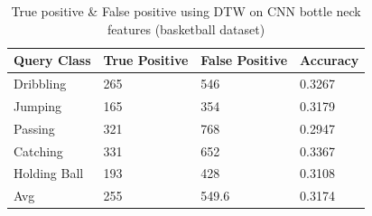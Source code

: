 \begin{table}[ht]
\caption[Event classification using DTW on CNN bottleneck features (OSUPEL basketball dataset) ]{True positive \& False positive using DTW on CNN bottle neck features (basketball dataset)}
\label{table:cnn_dtw_res_basket}
\centering
\begin{tabular}{|l|l|l|l|}
\hline
Query Class & True Positive & False Positive & Accuracy \\ \hline
Dribbling   &265  &546   &0.3267\\
Jumping     &165  &354   &0.3179\\
Passing     &321  &768   &0.2947\\
Catching    &331  &652   &0.3367\\
Holding Ball &193  &428   &0.3108\\
\hline
Avg         &255  &549.6 &0.3174\\
\hline  
\end{tabular}
\end{table} 

